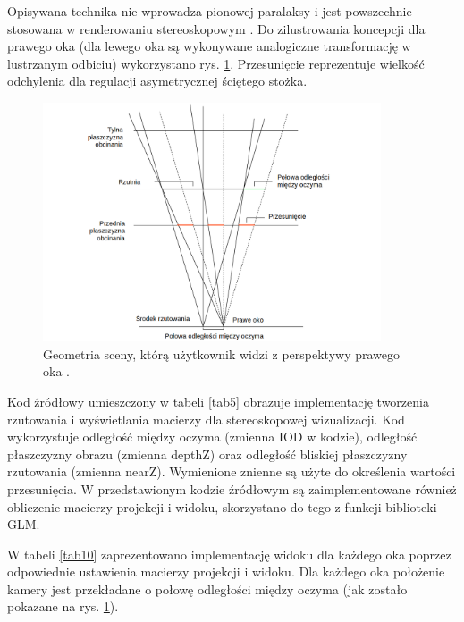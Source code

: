 Opisywana technika nie wprowadza pionowej paralaksy i jest powszechnie stosowana w renderowaniu stereoskopowym \cite{openglCookbook}. Do zilustrowania koncepcji dla prawego oka (dla lewego oka są wykonywane analogiczne transformację w lustrzanym odbiciu) wykorzystano rys. \ref{rys10}. Przesunięcie reprezentuje wielkość odchylenia dla regulacji asymetrycznej ściętego stożka.

\begin{figure}[H]
		\centering
 		\includegraphics[width=10cm]{stereoscopicGL.png}
    	\caption{Geometria sceny, którą użytkownik widzi z perspektywy prawego oka \cite{openglCookbook}.}
 		\label{rys10}
\end{figure}

Kod źródłowy umieszczony w tabeli \ref{tab5} obrazuje implementację tworzenia rzutowania i wyświetlania macierzy dla stereoskopowej wizualizacji. Kod wykorzystuje odległość między oczyma (zmienna IOD w kodzie), odległość płaszczyzny obrazu (zmienna depthZ) oraz odległość bliskiej płaszczyzny rzutowania (zmienna nearZ).  Wymienione znienne są użyte do określenia wartości przesunięcia. W przedstawionym kodzie źródłowym są zaimplementowane również obliczenie macierzy projekcji i widoku, skorzystano do tego z funkcji biblioteki GLM. 

W tabeli \ref{tab10} zaprezentowano implementację widoku dla każdego oka poprzez odpowiednie ustawienia macierzy projekcji i widoku. Dla każdego oka położenie kamery jest przekładane o połowę odległości między oczyma (jak zostało pokazane na rys. \ref{rys10}). 

